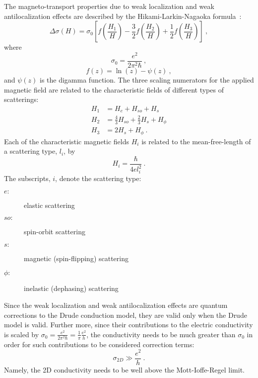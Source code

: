The magneto-transport properties due to weak localization and weak antilocalization effects are described by the Hikami-Larkin-Nagaoka formula~\cite{WL_HLN, bergmann1984}:%
\begin{equation}\label{eq:hln}
    \Delta\sigma(H) = \sigma_0\left[f\left(\frac{H_1}{H}\right) - \frac{3}{2}f\left(\frac{H_2}{H}\right) + \frac{1}{2}f\left(\frac{H_3}{H}\right)\right]~,
\end{equation}%
where%
\begin{equation}\label{eq:sigma0}
    \sigma_0 = \frac{e^2}{2\pi^2\hbar}~,
\end{equation}
\begin{equation}
    f(z) = \ln(z) - \psi(z)~,
\end{equation}
and $\psi(z)$ is the digamma function. The three scaling numerators for the applied magnetic field are related to the characteristic fields of different types of scatterings:%
\begin{align}
    H_1 &= H_e + H_{so} + H_s\nonumber\\
    H_2 &= \frac{4}{3}H_{so} + \frac{2}{3}H_s + H_\phi\\
    H_3 &= 2H_s + H_\phi~.\nonumber
\end{align}
Each of the characteristic magnetic fields $H_i$ is related to the mean-free-length of a scattering type, $l_i$, by
\begin{equation}
    H_i = \frac{\hbar}{4el_i^2}~.
\end{equation}
The subscripts, $i$, denote the scattering type:%
\begin{description}
    \item [$e:$] elastic scattering
    \item [$so:$] spin-orbit scattering
    \item [$s:$] magnetic (spin-flipping) scattering
    \item [$\phi:$] inelastic (dephasing) scattering
\end{description}

Since the weak localization and weak antilocalization effects are quantum corrections to the Drude conduction model, they are valid only when the Drude model is valid. Further more, since their contributions to the electric conductivity is scaled by $\sigma_0 = \frac{e^2}{2\pi^2\hbar} = \frac{1}{\pi}\frac{e^2}{h}$, the conductivity needs to be much greater than $\sigma_0$ in order for such contributions to be considered correction terms:%
\begin{equation}\label{eq:sigma0}
    \sigma_{2D} \gg \frac{e^2}{h}~.
\end{equation}%
Namely, the 2D conductivity needs to be well above the Mott-Ioffe-Regel limit.
